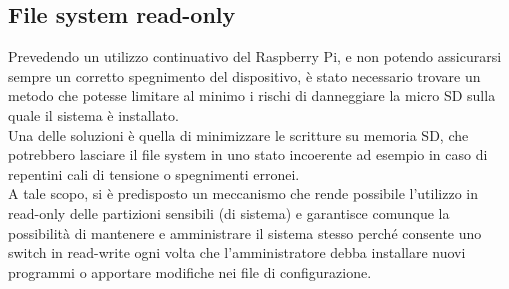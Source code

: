 


\subsection{File system read-only}
Prevedendo un utilizzo continuativo del Raspberry Pi, e non potendo assicurarsi sempre un corretto spegnimento del dispositivo, è stato necessario trovare un metodo che potesse limitare al minimo i rischi di danneggiare la micro SD sulla quale il sistema è installato. \\
Una delle soluzioni è quella di minimizzare le scritture su memoria SD, che potrebbero lasciare il file system in uno stato incoerente ad esempio in caso di repentini cali di tensione o spegnimenti erronei. \\ A tale scopo, si è predisposto un meccanismo che rende possibile l'utilizzo in read-only delle partizioni sensibili (di sistema) e garantisce comunque la possibilità di mantenere e amministrare il sistema stesso perché consente uno switch in read-write ogni volta che l'amministratore debba installare nuovi programmi o apportare modifiche nei file di configurazione.

